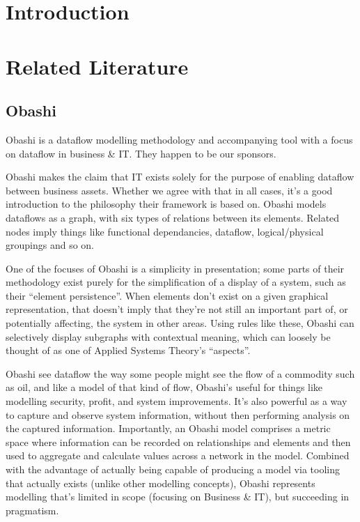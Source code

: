 \documentclass{article}
\begin{document}
\section{Introduction}

\section{Related Literature}

\subsection{Obashi}
Obashi\cite{ObashiMethodology} is a dataflow modelling methodology and accompanying tool with a focus on dataflow in
business \& IT. They happen to be our sponsors.\par

Obashi makes the claim that IT exists solely for the purpose of enabling dataflow between business assets. Whether we
agree with that in all cases, it's a good introduction to the philosophy their framework is based on. Obashi models
dataflows as a graph, with six types of relations between its elements. Related nodes imply things like functional
dependancies, dataflow, logical/physical groupings and so on.\par

One of the focuses of Obashi is a simplicity in presentation; some parts of their methodology exist purely for the
simplification of a display of a system, such as their ``element persistence''. When elements don't exist on a given
graphical representation, that doesn't imply that they're not still an important part of, or potentially affecting, the
system in other areas. Using rules like these, Obashi can selectively display subgraphs with contextual meaning, which
can loosely be thought of as one of Applied Systems Theory's ``aspects''\cite{dekkers:appliedsystemstheory}.

Obashi see dataflow the way some people might see the flow of a commodity such as oil, and like a model of that kind of
flow, Obashi's useful for things like modelling security, profit, and system improvements. It's also powerful as a way
to capture and observe system information, without then performing analysis on the captured information. Importantly, an
Obashi model comprises a metric space where information can be recorded on relationships and elements and then used to
aggregate and calculate values across a network in the model. Combined with the advantage of actually being capable of
producing a model via tooling that actually exists (unlike other modelling concepts), Obashi represents modelling that's
limited in scope (focusing on Business \& IT), but succeeding in pragmatism.
\end{document}
